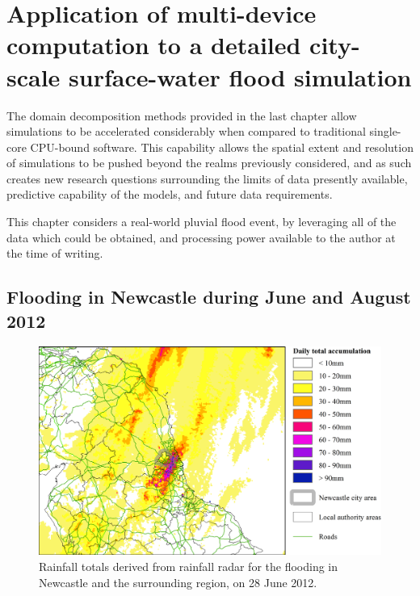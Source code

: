 \chapter{Application of multi-device computation to a detailed city-scale surface-water flood simulation}
\label{chapter:ScaleEffects}

The domain decomposition methods provided in the last chapter allow simulations to be accelerated considerably when compared to traditional single-core CPU-bound software. This capability allows the spatial extent and resolution of simulations to be pushed beyond the realms previously considered, and as such creates new research questions surrounding the limits of data presently available, predictive capability of the models, and future data requirements.

This chapter considers a real-world pluvial flood event, by leveraging all of the data which could be obtained, and processing power available to the author at the time of writing.

\section{Flooding in Newcastle during June and August 2012}

\begin{figure}[tpb]
	\centering
	\includegraphics[width=1.0\textwidth]{newcastle-pluvial-figures/radar-rainfall-totals.png}
	\caption{Rainfall totals derived from rainfall radar for the flooding in Newcastle and the surrounding region, on 28 June 2012.}
	\label{Newcastle_Pluvial_RainTotal}
\end{figure}

